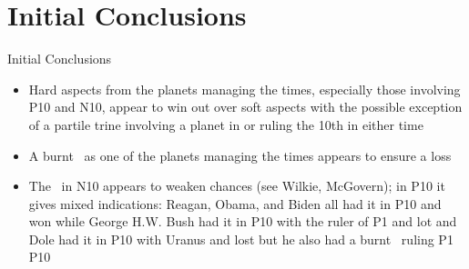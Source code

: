 \section{Initial Conclusions}
\begin{frame}[t]{Initial Conclusions}
\centering
\begin{minipage}{0.9\textwidth}
\begin{itemize}
\item Hard aspects from the planets managing the times, especially those involving P10 and N10, appear to win out over soft aspects with the possible exception of a partile trine involving a planet in or ruling the 10th in either time
\vspace{0.5em}

\item A burnt \Mercury\, as one of the planets managing the times appears to ensure a loss
\vspace{0.5em}

\item The \SouthNode\, in N10 appears to weaken chances (see Wilkie, McGovern); in P10 it gives mixed indications: Reagan, Obama, and Biden all had it in P10 and won while George H.W. Bush had it in P10 with the ruler of P1 and lot and Dole had it in P10 with Uranus and lost but he also had a burnt \Mercury\, ruling P1 \Trine\, P10
\end{itemize}
\end{minipage}
\end{frame}
